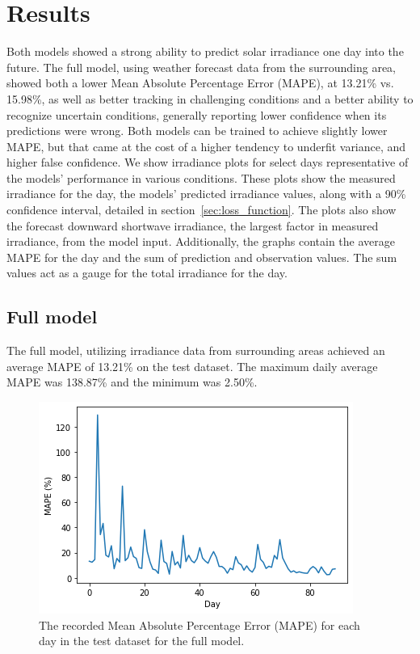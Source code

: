 \chapter{Results}
Both models showed a strong ability to predict solar irradiance one day into the future.
The full model, using weather forecast data from the surrounding area, showed both a lower Mean Absolute Percentage Error (MAPE), at 13.21\% vs. 15.98\%, as well as better tracking in challenging conditions and a better ability to recognize uncertain conditions, generally reporting lower confidence when its predictions were wrong. Both models can be trained to achieve slightly lower MAPE, but that came at the cost of a higher tendency to underfit variance, and higher false confidence.
We show irradiance plots for select days representative of the models' performance in various conditions. These plots show the measured irradiance for the day, the models' predicted irradiance values, along with a 90\% confidence interval, detailed in section~\ref{sec:loss_function}. The plots also show the forecast downward shortwave irradiance, the largest factor in measured irradiance, from the model input. Additionally, the graphs contain the average MAPE for the day and the sum of prediction and observation values. The sum values act as a gauge for the total irradiance for the day.


\section{Full model}
The full model, utilizing irradiance data from surrounding areas achieved an average MAPE of 13.21\% on the test dataset. The maximum daily average MAPE was 138.87\% and the minimum was 2.50\%. 
\begin{figure}[ht!]
    \centering
    \includegraphics[scale=0.75]{imgs/graphs/full/days_full.png}
    \caption{The recorded Mean Absolute Percentage Error (MAPE) for each day in the test dataset for the full model. 
    \label{fig:days_full}}
\end{figure}




